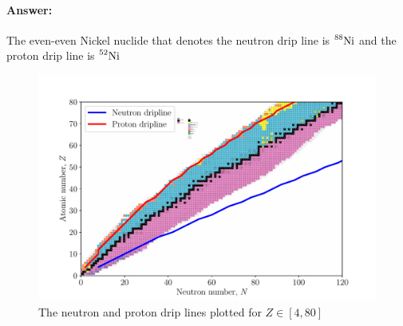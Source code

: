 \paragraph{Answer:} The even-even Nickel nuclide that denotes the neutron drip line is $\nuc{Ni}{88}{}$ and the proton drip line is $\nuc{Ni}{52}{}$

\begin{figure}[t]
    \centering
    \includegraphics[width=\textwidth]{figures/driplines.pdf}
    \caption{The neutron and proton drip lines plotted for $Z \in [4, 80]$}
    \label{fig:driplines}
\end{figure}